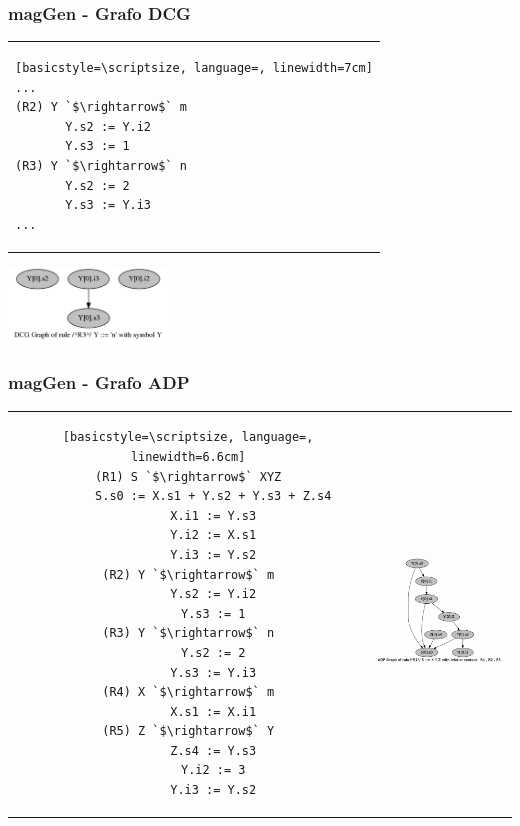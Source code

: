 \documentclass[10pt]{beamer}
\begin{document}
\begin{frame}[fragile]
        \frametitle{magGen - Grafo DCG}
\begin{center}        
\begin{tabular}{p{6cm}}
\begin{lstlisting}[basicstyle=\scriptsize, language=, linewidth=7cm]
...
(R2) Y `$\rightarrow$` m
       Y.s2 := Y.i2
       Y.s3 := 1
(R3) Y `$\rightarrow$` n
       Y.s2 := 2
       Y.s3 := Y.i3
...
\end{lstlisting}
\end{tabular}
\end{center}
\begin{center}\includegraphics[width=160px, height=77px]{./12_dcg_graph.png}\end{center}
\end{frame}


\begin{frame}[fragile]
        \frametitle{magGen - Grafo ADP}
\begin{tabular}{cp{4.5cm}}
\hspace{-0.5cm}\begin{lstlisting}[basicstyle=\scriptsize, language=, linewidth=6.6cm]
(R1) S `$\rightarrow$` XYZ
       S.s0 := X.s1 + Y.s2 + Y.s3 + Z.s4
       X.i1 := Y.s3
       Y.i2 := X.s1
       Y.i3 := Y.s2
(R2) Y `$\rightarrow$` m
       Y.s2 := Y.i2
       Y.s3 := 1
(R3) Y `$\rightarrow$` n
       Y.s2 := 2
       Y.s3 := Y.i3
(R4) X `$\rightarrow$` m
       X.s1 := X.i1
(R5) Z `$\rightarrow$` Y
       Z.s4 := Y.s3
       Y.i2 := 3
       Y.i3 := Y.s2
\end{lstlisting}
&\hspace{0.2cm}\parbox[c]{1em}{\includegraphics[width=149px, height=150px]{./15_adp_graph.png}}
\end{tabular}

\end{frame}
\end{document}
